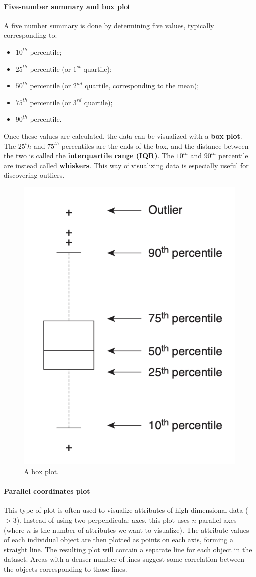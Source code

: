 \paragraph{Five-number summary and box plot}
A five number summary is done by determining five values, typically corresponding to:

\begin{itemize}
    \item $10^{th}$ percentile;
    \item $25^{th}$ percentile (or $1^{st}$ quartile);
    \item $50^{th}$ percentile (or $2^{nd}$ quartile, corresponding to the mean);
    \item $75^{th}$ percentile (or $3^{rd}$ quartile);
    \item $90^{th}$ percentile.
\end{itemize}

Once these values are calculated, the data can be visualized with a \textbf{box plot}. The $25^th$ and $75^{th}$ percentiles are the ends of the box, and the distance between the two is called the \textbf{interquartile range (IQR)}. The $10^{th}$ and $90^{th}$ percentile are instead called \textbf{whiskers}. This way of visualizing data is especially useful for discovering outliers.

\begin{figure}[ht]
    \centering
    \includegraphics[width=0.4\linewidth]{img/box plot.png}
    \caption{A box plot.}
\end{figure}

\paragraph{Parallel coordinates plot}
This type of plot is often used to visualize attributes of high-dimensional data ($> 3$). Instead of using two perpendicular axes, this plot uses $n$ parallel axes (where $n$ is the number of attributes we want to visualize). The attribute values of each individual object are then plotted as points on each axis, forming a straight line. The resulting plot will contain a separate line for each object in the dataset. Areas with a denser number of lines suggest some correlation between the objects corresponding to those lines.


